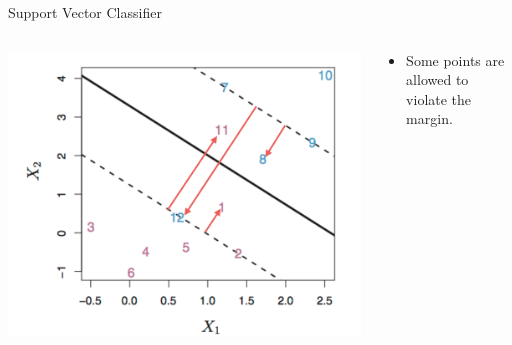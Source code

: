 \begin{frame}{Support Vector Classifier}
\begin{columns}
  \begin{column}{0.5\textwidth}
    \includegraphics[width=\linewidth]{images/support-vector-machines/support-vector-machines-12.png}
  \end{column}
  \begin{column}{0.5\textwidth}
    \begin{itemize}
      \item Some points are allowed to violate the margin.
    \end{itemize}
  \end{column}
\end{columns}
\end{frame}


